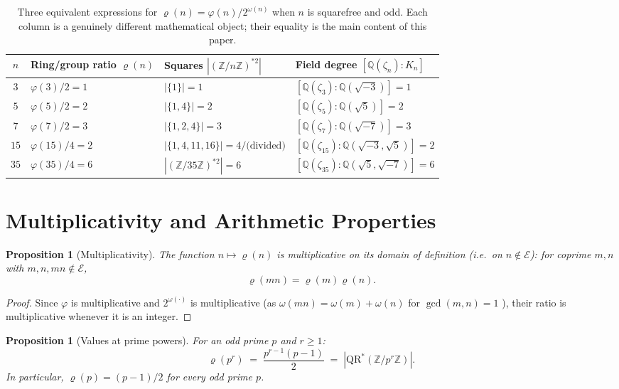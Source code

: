 \documentclass[12pt]{amsart}
\theoremstyle{bluehead}
\newtheorem{proposition}[theorem]{Proposition}
\theoremstyle{orangehead}
\theoremstyle{greenhead}
\newcommand{\Z}{\mathbb{Z}}
\newcommand{\Q}{\mathbb{Q}}
\newcommand{\QRS}{\mathrm{QR}^{*}}
\renewcommand{\phi}{\varphi}
\newcommand{\Exc}{\mathcal{E}}
\begin{document}
\begin{table}[!ht]
\centering
\caption{Three equivalent expressions for $\varrho(n)=\phi(n)/2^{\omega(n)}$
  when $n$ is squarefree and odd.  Each column is a genuinely different
  mathematical object; their equality is the main content of this paper.}
\label{tab:three}
\small
\begin{tabular}{@{}clll@{}}
\toprule
$n$ & Ring/group ratio $\varrho(n)$ & Squares $|(\Z/n\Z)^{*2}|$ & Field degree $[\Q(\zeta_n):K_n]$\\
\midrule
$3$   & $\phi(3)/2=1$   & $|\{1\}|=1$   & $[\Q(\zeta_3):\Q(\sqrt{-3})]=1$\\
$5$   & $\phi(5)/2=2$   & $|\{1,4\}|=2$ & $[\Q(\zeta_5):\Q(\sqrt{5})]=2$\\
$7$   & $\phi(7)/2=3$   & $|\{1,2,4\}|=3$ & $[\Q(\zeta_7):\Q(\sqrt{-7})]=3$\\
$15$  & $\phi(15)/4=2$  & $|\{1,4,11,16\}|=4/\text{(divided)}$ & $[\Q(\zeta_{15}):\Q(\sqrt{-3},\sqrt{5})]=2$\\
$35$  & $\phi(35)/4=6$  & $|(\Z/35\Z)^{*2}|=6$ & $[\Q(\zeta_{35}):\Q(\sqrt{5},\sqrt{-7})]=6$\\
\bottomrule
\end{tabular}
\end{table}

\section{Multiplicativity and Arithmetic Properties}\label{sec:mult}

\begin{proposition}[Multiplicativity]\label{prop:mult}
  The function $n\mapsto\varrho(n)$ is multiplicative on its domain
  of definition (i.e.\ on $n\notin\Exc$): for coprime $m,n$ with
  $m,n,mn\notin\Exc$,
  \[
    \varrho(mn)=\varrho(m)\varrho(n).
  \]
\end{proposition}

\begin{proof}
  Since $\phi$ is multiplicative and $2^{\omega(\cdot)}$ is multiplicative
  (as $\omega(mn)=\omega(m)+\omega(n)$ for $\gcd(m,n)=1$ \cite{apostol1976}), their ratio
  is multiplicative whenever it is an integer.
\qedhere
\end{proof}

\begin{proposition}[Values at prime powers]\label{prop:primepow}
  For an odd prime $p$ and $r\ge1$:
  \[
    \varrho(p^r)\;=\;\frac{p^{r-1}(p-1)}{2}\;=\;|\QRS(\Z/p^r\Z)|.
  \]
  In particular, $\varrho(p)=(p-1)/2$ for every odd prime $p$.
\end{proposition}
\end{document}
